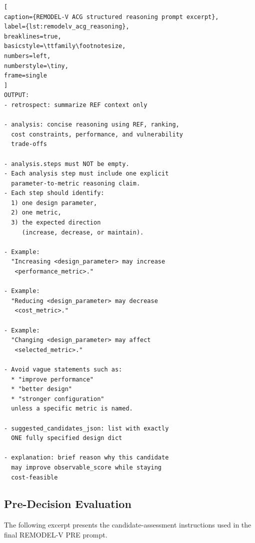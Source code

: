 \begin{lstlisting}[
caption={REMODEL-V ACG structured reasoning prompt excerpt},
label={lst:remodelv_acg_reasoning},
breaklines=true,
basicstyle=\ttfamily\footnotesize,
numbers=left,
numberstyle=\tiny,
frame=single
]
OUTPUT:
- retrospect: summarize REF context only

- analysis: concise reasoning using REF, ranking,
  cost constraints, performance, and vulnerability
  trade-offs

- analysis.steps must NOT be empty.
- Each analysis step must include one explicit
  parameter-to-metric reasoning claim.
- Each step should identify:
  1) one design parameter,
  2) one metric,
  3) the expected direction
     (increase, decrease, or maintain).

- Example:
  "Increasing <design_parameter> may increase
   <performance_metric>."

- Example:
  "Reducing <design_parameter> may decrease
   <cost_metric>."

- Example:
  "Changing <design_parameter> may affect
   <selected_metric>."

- Avoid vague statements such as:
  * "improve performance"
  * "better design"
  * "stronger configuration"
  unless a specific metric is named.

- suggested_candidates_json: list with exactly
  ONE fully specified design dict

- explanation: brief reason why this candidate
  may improve observable_score while staying
  cost-feasible
\end{lstlisting}


\subsection{Pre-Decision Evaluation}
\label{app:remodelv_prompts_pre}


The following excerpt presents the candidate-assessment
instructions used in the final REMODEL-V PRE prompt.


